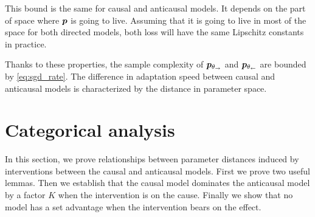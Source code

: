 \begin{subappendices}
This bound is the same for causal and anticausal models. It depends on the part of space where ${\bm{p}}$ is going to live. Assuming that it is going to live in most of the space for both directed models, both loss will have the same Lipschitz constants in practice.

Thanks to these properties, the sample complexity of $\bm{p}_{\theta_\rightarrow}$ and $\bm{p}_{\theta_\leftarrow}$ are bounded by \eqref{eq:sgd_rate}. 
The difference in adaptation speed between causal and anticausal models is characterized by the distance in parameter space. 




\section{{Categorical analysis}}
\label{apdx:categorical_analysis}

In this section, we prove relationships between parameter distances induced by interventions between the causal and anticausal models. 
First we prove two useful lemmas. 
Then we establish that the causal model dominates the anticausal model by a factor $K$ when the intervention is on the cause. 
Finally we show that no model has a set advantage when the intervention bears on the effect.



\end{subappendices}
